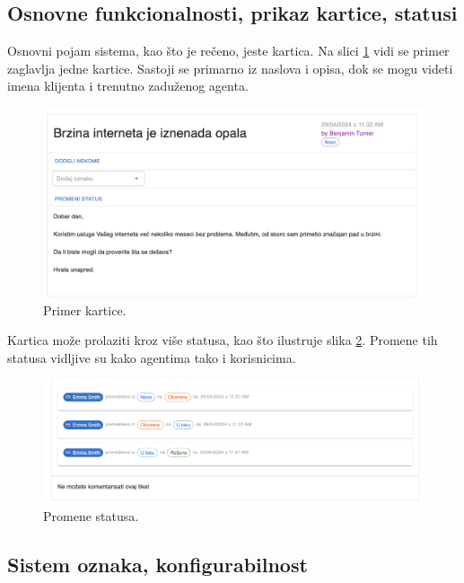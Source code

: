 \documentclass[12pt,oneside]{memoir}
\begin{document}
\subsection{Osnovne funkcionalnosti, prikaz kartice, statusi}

Osnovni pojam sistema, kao što je rečeno, jeste kartica. Na slici \ref{fig:sts_ticket} vidi se primer zaglavlja jedne kartice. Sastoji se primarno iz naslova i opisa, dok se mogu videti imena klijenta i trenutno zaduženog agenta.

\begin{figure}[h]
  \centering
  \includegraphics[width=1\textwidth]{docs/images/ch_1/ticket-title.png} 
  \caption{Primer kartice.}
  \label{fig:sts_ticket}
\end{figure}

Kartica može prolaziti kroz više statusa, kao što ilustruje slika \ref{fig:sts_ticket_statuses}. Promene tih statusa vidljive su kako agentima tako i korisnicima.

\begin{figure}[h]
  \centering
  \includegraphics[width=1\textwidth]{docs/images/ch_1/ticket-statuses.png} 
  \caption{Promene statusa.}
  \label{fig:sts_ticket_statuses}
\end{figure}

\subsection{Sistem oznaka, konfigurabilnost}
\label{sec:tagsystem}
\end{document}
